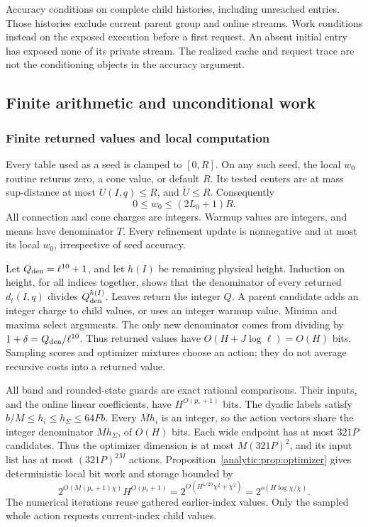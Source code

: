 \documentclass[11pt]{article}
\theoremstyle{definition}
\newcommand{\1}{\mathbf 1}
\begin{document}
Accuracy conditions on complete child histories, including unreached
entries. Those histories exclude current parent group and online streams.
Work conditions instead on the exposed execution before a first request.
An absent initial entry has exposed none of its private stream.
The realized cache and request trace are not the conditioning objects
in the accuracy argument.

\subsection{Finite arithmetic and unconditional work}
\label{refine:sec:work}

\subsubsection{Finite returned values and local computation}

Every table used as a seed is clamped to $[0,R]$.
On any such seed, the local $w_0$ routine returns zero, a cone value,
or default $R$. Its tested centers are at mass sup-distance at most
$U(I,q)\le R$, and $\widetilde U\le R$. Consequently
\[
 0\le w_0\le(2L_0+1)R.
\]
All connection and cone charges are integers.
Warmup values are integers, and means have denominator $T$.
Every refinement update is nonnegative and at most its local $w_0$,
irrespective of seed accuracy.

Let $Q_{\rm den}=\ell^{10}+1$, and let $h(I)$ be remaining physical
height. Induction on height, for all indices together, shows that the
denominator of every returned $d_t(I,q)$ divides $Q_{\rm den}^{h(I)}$.
Leaves return the integer $Q$.
A parent candidate adds an integer charge to child values, or uses an
integer warmup value. Minima and maxima select arguments.
The only new denominator comes from dividing by
$1+\delta=Q_{\rm den}/\ell^{10}$.
Thus returned values have
$O(H+J\log\ell)=O(H)$ bits.
Sampling scores and optimizer mixtures choose an action; they do not
average recursive costs into a returned value.

All band and rounded-state guards are exact rational comparisons.
Their inputs, and the online linear coefficients, have
$H^{O(p_*+1)}$ bits.
The dyadic labels satisfy $b/M\le h_i\le h_\Sigma\le64Fb$.
Every $Mh_i$ is an integer, so the action vectors share the integer
denominator $Mh_\Sigma$, of $O(H)$ bits.
Each wide endpoint has at most $321P$ candidates.
Thus the optimizer dimension is at most $M(321P)^2$, and its input
list has at most $(321P)^{2M}$ actions.
Proposition~\ref{analytic:prop:optimizer} gives deterministic local bit
work and storage bounded by
\[
 2^{O(M(p_*+1)\chi)}H^{O(p_*+1)}
 =2^{O(H^{1/20}\chi^2+\chi^2)}
 =2^{o(H\log\chi/\chi)}.
\]
The numerical iterations reuse gathered earlier-index values.
Only the sampled whole action requests current-index child values.
\end{document}
